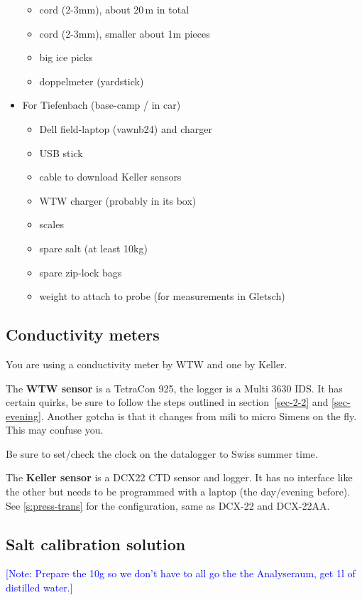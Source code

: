 \documentclass[DIV=15,halfparskip,11pt,headinclude]{scrartcl}
\newcommand{\note}[1]{\textcolor{blue}{[Note: #1]}}
\newcommand{\note}[1]{}
\begin{document}
\begin{itemize}
\begin{itemize}
  \item cord (2-3mm), about 20\,m in total
  \item cord (2-3mm), smaller about 1m pieces
  \item big ice picks
  \item doppelmeter (yardstick)
  \end{itemize}
\item For Tiefenbach (base-camp / in car)
  \begin{itemize}
  \item Dell field-laptop (vawnb24) and charger
  \item USB stick
  \item cable to download Keller sensors
  \item WTW charger (probably in its box)
  \item scales
  \item spare salt (at least 10kg)
  \item spare zip-lock bags
  \item weight to attach to probe (for measurements in Gletsch)
  \end{itemize}
\end{itemize}


\subsection{Conductivity meters}
\label{s:cond-meters}

You are using a conductivity meter by WTW and one by Keller.

The \textbf{WTW sensor} is a TetraCon 925, the logger is a Multi 3630 IDS.  It
has certain quirks, be sure to follow the steps outlined in
section~\ref{sec-2-2} and \ref{sec-evening}.  Another gotcha is that
it changes from mili to micro Simens on the fly.  This may confuse
you.

Be sure to set/check the clock on the datalogger to Swiss summer time.

The \textbf{Keller sensor} is a DCX22 CTD sensor and logger.  It has
no interface like the other but needs to be programmed with a laptop
(the day/evening before).  See \ref{s:press-trans} for the
configuration, same as DCX-22 and DCX-22AA.

\subsection{Salt calibration solution}
\note{Prepare the 10g so we don't have to all go the the Analyseraum,
  get 1l of distilled water.}
\end{document}
